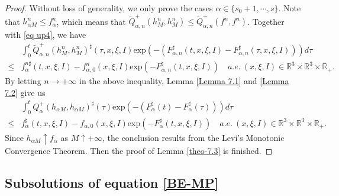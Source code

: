 \documentclass[reqno,11pt]{amsart}
\numberwithin{equation}{section}
\def\R{\mathbb{R}}
\def\exp{\mathrm{exp}}
\begin{document}
\begin{proof}
	Without loss of generality, we only prove the cases $\alpha \in \{s_0+1,\cdots,s\}$. Note that $h^n_{\alpha M} \leq f^n_\alpha$, which means that $ \tilde{Q}^+_{\alpha ,n} (h^n_{M} ,h^n_{M}) \leq \tilde{Q}^+_{\alpha ,n} (f^n ,f^n) $. Together with \eqref{eq up4}, we have
	\begin{equation*}
		\begin{aligned}
			&\int_{0}^{t}\tilde{Q}^+_{\alpha ,n} (h^n_{M} ,h^n_{M})^\sharp (\tau ,x,\xi ,I) \exp(-(F^\sharp _{\alpha,n } (t,x,\xi ,I)-F^\sharp _{\alpha ,n} (\tau,x,\xi ,I))) d \tau \\
			\leq &f^{n\sharp}_\alpha (t,x,\xi ,I) -f^n_{\alpha ,0} (x,\xi ,I )\exp(-F^\sharp _{\alpha ,n } (t,x,\xi ,I)) \quad a.e. \ (x,\xi ,I) \in \R^3 \times \R^3 \times \R_+ .
		\end{aligned}
	\end{equation*}
By letting $n \to + \infty$ in the above inequality, Lemma \ref{Lemma 7.1} and \ref{Lemma 7.2} give us
	\begin{equation*}
		\begin{aligned}
			&\int_{0}^{t}Q^+_{\alpha } (h_{\alpha M} ,h_{\alpha M})^\sharp (\tau) \exp(-(F^\sharp _{\alpha } (t)-F^\sharp _{\alpha} (\tau))) d \tau \\
			\leq &f^{\sharp}_\alpha (t,x,\xi ,I) -f_{\alpha ,0} (x,\xi ,I )\exp(-F^\sharp _{\alpha } (t,x,\xi ,I)) \quad a.e. \ (x,\xi ,I) \in \R^3 \times \R^3 \times \R_+.
		\end{aligned}
	\end{equation*}
	Since $h_{\alpha M}\uparrow f_\alpha $ as $M \uparrow +\infty$, the conclusion results from the Levi's Monotonic Convergence Theorem. Then the proof of Lemma \ref{theo-7.3} is finished.
\end{proof}

\subsection{Subsolutions of equation \eqref{BE-MP}}
\end{document}
